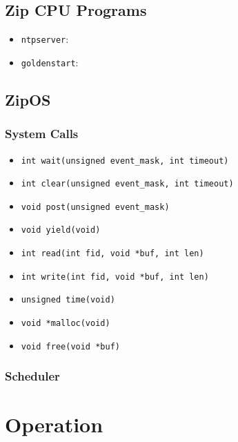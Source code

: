 \documentclass{gqtekspec}
\begin{document}
\section{Zip CPU Programs}
\begin{itemize}
\item {\tt ntpserver}:
\item {\tt goldenstart}:
\end{itemize}
\section{ZipOS}
\subsection{System Calls}
\begin{itemize}
\item {\tt int wait(unsigned event\_mask, int timeout)}
\item {\tt int clear(unsigned event\_mask, int timeout)}
\item {\tt void post(unsigned event\_mask)}
\item {\tt void yield(void) }
\item {\tt int read(int fid, void *buf, int len)}
\item {\tt int write(int fid, void *buf, int len)}
\item {\tt unsigned time(void) }
\item {\tt void *malloc(void)}
\item {\tt void free(void *buf)}
\end{itemize}
\subsection{Scheduler}

\chapter{Operation}\label{ch:operation}
\end{document}
